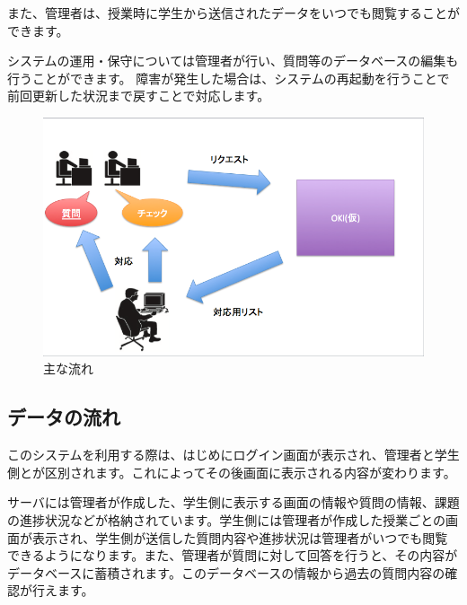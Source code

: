 \documentclass[a4j,titlepage]{ujarticle}
\begin{document}
また、管理者は、授業時に学生から送信されたデータをいつでも閲覧することができます。



システムの運用・保守については管理者が行い、質問等のデータベースの編集も行うことができます。
障害が発生した場合は、システムの再起動を行うことで前回更新した状況まで戻すことで対応します。 %
\begin{figure}[h]

\centering
   \includegraphics[width=13cm]{hito.png}
  \caption{主な流れ}
\end{figure}


\subsection{データの流れ}
このシステムを利用する際は、はじめにログイン画面が表示され、管理者と学生側とが区別されます。これによってその後画面に表示される内容が変わります。

サーバには管理者が作成した、学生側に表示する画面の情報や質問の情報、課題の進捗状況などが格納されています。学生側には管理者が作成した授業ごとの画面が表示され、学生側が送信した質問内容や進捗状況は管理者がいつでも閲覧できるようになります。また、管理者が質問に対して回答を行うと、その内容がデータベースに蓄積されます。このデータベースの情報から過去の質問内容の確認が行えます。
\end{document}
